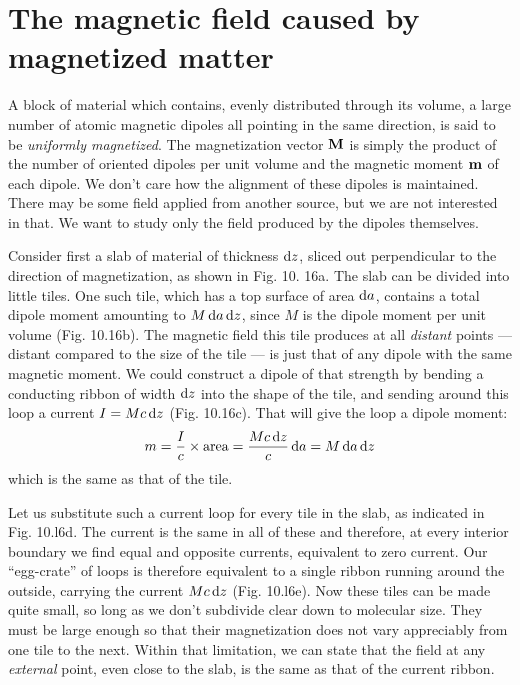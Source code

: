 \section{The magnetic field caused by magnetized matter}

A block of material which contains, evenly distributed through its
volume, a large number of atomic magnetic dipoles all pointing in
the same direction, is said to be \emph{uniformly magnetized}. The magnetization
vector $\mathbf{M}$ is simply the product of the number of oriented
dipoles per unit volume and the magnetic moment $\mathbf{m}$ of each dipole.
We don't care how the alignment of these dipoles is maintained.
There may be some field applied from another source, but we are
not interested in that. We want to study only the field produced
by the dipoles themselves.

Consider first a slab of material of thickness $\operatorname{d\!} z$, sliced out perpendicular
to the direction of magnetization, as shown in Fig. 10. 16a.
The slab can be divided into little tiles. One such tile, which has a
top surface of area $\operatorname{d\!} a$, contains a total dipole moment amounting to
$M \operatorname{d\!} a \operatorname{d\!} z$, since $M$ is the dipole moment per unit volume (Fig. 10.16b).
The magnetic field this tile produces at all \emph{distant} points --- distant
compared to the size of the tile --- is just that of any dipole with the
same magnetic moment. We could construct a dipole of that
strength by bending a conducting ribbon of width $\operatorname{d\!} z$ into the shape
of the tile, and sending around this loop a current $I = Mc\operatorname{d\!} z$ 
(Fig. 10.16c). That will give the loop a dipole moment:
\begin{equation}
  m = \frac{I}{c}\times\text{area} = \frac{Mc\operatorname{d\!} z}{c}\operatorname{d\!} a = M\operatorname{d\!} a\operatorname{d\!} z
\end{equation}
which is the same as that of the tile.

Let us substitute such a current loop for every tile in the slab, as
indicated in Fig. 10.l6d. The current is the same in all of these and
therefore, at every interior boundary we find equal and opposite
currents, equivalent to zero current. Our ``egg-crate'' of loops is
therefore equivalent to a single ribbon running around the outside,
carrying the current $Mc \operatorname{d\!} z$ (Fig. 10.l6e). Now these tiles can be
made quite small, so long as we don't subdivide clear down to molecular
size. They must be large enough so that their magnetization
does not vary appreciably from one tile to the next. Within that
limitation, we can state that the field at any \emph{external} point, even close
to the slab, is the same as that of the current ribbon.


